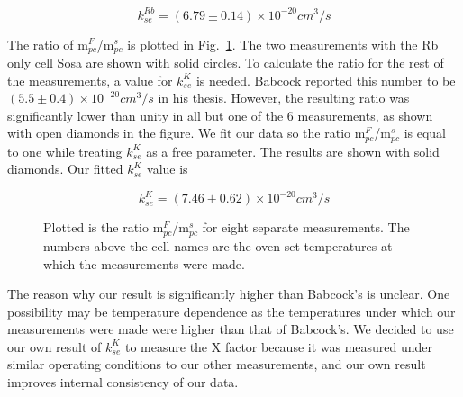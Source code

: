 \begin{equation}
k_{se}^{Rb}=(6.79\pm 0.14)\times 10^{-20}cm^{3}/s
\end{equation}

The ratio of m$_{pc}^{F}$/m$_{pc}^{s}$ is plotted in Fig.~\ref{m_ratio}. The two measurements with the Rb only cell Sosa are shown with solid circles. To calculate the ratio for the rest of the measurements, a value for $k_{se}^{K}$ is needed. Babcock reported this number to be $(5.5\pm 0.4)\times 10^{-20}cm^{3}/s$ in his thesis. However, the resulting ratio was significantly lower than unity in all but one of the 6 measurements, as shown with open diamonds in the figure. We fit our data so the ratio m$_{pc}^{F}$/m$_{pc}^{s}$ is equal to one while treating $k_{se}^{K}$ as a free parameter. The results are shown with solid diamonds. Our fitted $k_{se}^{K}$ value is

\begin{equation}
k_{se}^{K}=(7.46\pm 0.62)\times 10^{-20}cm^{3}/s
\end{equation}

\begin{figure}[t!]
	\label{m_ratio}
	\centering
	\caption{{Plotted is the ratio m$_{pc}^{F}$/m$_{pc}^{s}$ for eight separate measurements. The numbers above the cell names are the oven set temperatures at which the measurements were made.}}
\end{figure}

The reason why our result is significantly higher than Babcock's is unclear. One possibility may be temperature dependence as the temperatures under which our measurements were made were higher than that of Babcock's. We decided to use our own result of $k_{se}^{K}$ to measure the X factor because it was measured under similar operating conditions to our other measurements, and our own result improves internal consistency of our data.


